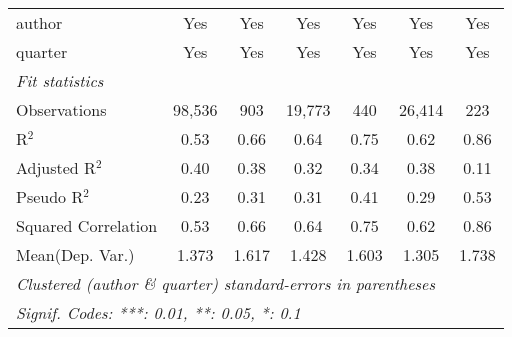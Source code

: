 \begin{tabular}{lcccccc}
   author                                                     & Yes           & Yes           & Yes            & Yes          & Yes           & Yes\\  
   quarter                                                    & Yes           & Yes           & Yes            & Yes          & Yes           & Yes\\  
   \midrule
   \emph{Fit statistics}\\
   Observations                                               & 98,536        & 903           & 19,773         & 440          & 26,414        & 223\\  
   R$^2$                                                      & 0.53          & 0.66          & 0.64           & 0.75         & 0.62          & 0.86\\  
   Adjusted R$^2$                                             & 0.40          & 0.38          & 0.32           & 0.34         & 0.38          & 0.11\\  
   Pseudo R$^2$                                               & 0.23          & 0.31          & 0.31           & 0.41         & 0.29          & 0.53\\  
   Squared Correlation                                        & 0.53          & 0.66          & 0.64           & 0.75         & 0.62          & 0.86\\  
Mean(Dep. Var.) & 1.373 & 1.617 & 1.428 & 1.603 & 1.305 & 1.738 \\
   \midrule \midrule
   \multicolumn{7}{l}{\emph{Clustered (author \& quarter) standard-errors in parentheses}}\\
   \multicolumn{7}{l}{\emph{Signif. Codes: ***: 0.01, **: 0.05, *: 0.1}}\\
\end{tabular}
\par\endgroup
